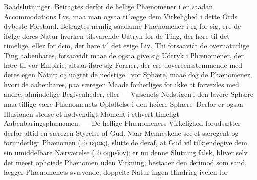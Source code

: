 \documentclass[12pt]{book}
\begin{document}
Raadslutninger. Betragtes derfor de hellige Phænomener i en saadan
Accommodations Lys, maa man ogsaa tillægge dem Virkelighed i dette Ords dybeste
Forstand. Betragtes nemlig saadanne Phænomener i og for sig, ere de ifølge deres
Natur hverken tilsvarende Udtryk for de Ting, der høre til det timelige, eller
for dem, der høre til det evige Liv. Thi forsaavidt de overnaturlige Ting
aabenbares, forsaavidt maae de ogsaa give sig Udtryk i Phænomener, der høre til
vor Empirie, altsaa iføre sig Former, der ere uovereensstemmende med deres egen
Natur; og uagtet de nedstige i vor Sphære, maae dog de Phænomener, hvori de
aabenbares, paa særegen Maade forherliges for ikke at forvexles med andre,
almindelige Begivenheder, eller --- Væsenets Nedstigen i den lavere Sphære maa
tillige være Phænomenets Opløftelse i den høiere Sphære. Derfor er ogsaa
Illusionen stedse et nødvendigt Moment i ethvert timeligt
Aabenbaringsphænomen. --- De hellige Phænomeners Virkelighed forudsætter derfor
altid en særegen Styrelse af Gud. Naar Menneskene see et særegent og
forunderligt Phænomen (τὸ τέρας), slutte de deraf, at Gud vil tilkjendegive dem
sin umiddelbare Nærværelse (τὸ σημεῖον); er nu denne Slutning falsk, bliver
selv det meest ophøiede Phænomen uden Virkning; bestaaer den derimod som sand,
lægger Phænomenets svævende, doppelte Natur ingen Hindring iveien for
\end{document}

